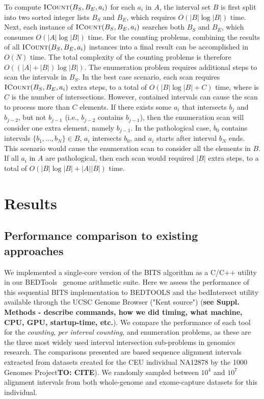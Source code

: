 \documentclass{bioinfo}
\begin{document}
	To compute $\textsc{ICount}(B_S,B_E,a_i)$ for each $a_i$ in $A$, the interval
	set $B$ is first split into two sorted integer lists $B_S$ and $B_E$,
	which requires $O(|B| \log |B|)$ time.  Next, each instance of
	$\textsc{ICount}(B_S,B_E,a_i)$ searches both $B_S$ and $B_E$, which consumes
	$O(|A| \log |B|)$ time.  For the counting problems, combining the
	results of all $\textsc{ICount}(B_S,B_E,a_i)$ instances into a final result can
	be accomplished in $O(N)$ time.  The total complexity of the counting
	problems is therefore $O((|A| + |B|) \log |B|)$.
	The enumeration problem requires additional steps to scan the
	intervals in $B_S$.  In the best case scenario, each scan requires
	$\textsc{ICount}(B_S,B_E,a_i)$ extra steps, to a total of $O(|B| \log |B|
	+ C)$ time, where is $C$ is the number of intersections.
	However,
	contained intervals can cause the scan to process more than $C$
	elements.  If there exists some $a_i$ that intersects $b_{j}$ and
	$b_{j-2}$, but not $b_{j-1}$ (i.e., $b_{j-2}$ contains $b_{j-1}$),
	then the enumeration scan will consider one extra element, namely
	$b_{j-1}$.  In the pathological case, $b_0$ contains intervals $\{b_1,
	\dots, b_N\} \in B$, $a_i$ intersects $b_0$, and $a_i$ starts after
	interval $b_N$ ends.  This scenario would cause the enumeration scan
	to consider all the elements in $B$.  If all $a_i$ in $A$ are
	pathological, then each scan would required $|B|$ extra steps, to a
	total of $O(|B| \log |B| + |A||B|)$ time.



	\section{Results}
	
	\subsection{Performance comparison to existing approaches}
	We implemented a single-core version of the BITS algorithm as a C/C++ utility 
	in our BEDTools~\citep{quinlan2010} genome arithmetic suite.
	Here we assess the performance of this sequential BITS implementation to BEDTOOLS and 
	the bedIntersect utility available through the UCSC Genome Browser ("Kent source") \citep{kent2002} 
	(\textbf{see Suppl. Methods - describe commands, how we did timing, what machine, CPU, GPU, startup-time, etc.}).
	We compare the performance of each tool for the \emph{counting}, \emph{per interval counting}, 
	and enumeration problems, as these are the three most widely used interval intersection sub-problems in genomics research. 
	The comparisons presented are based sequence alignment intervals extracted from datasets created 
	for the CEU individual NA12878 by the 1000 Genomes Project\textbf{TO: CITE}).  We randomly sampled 
	between $10^4$ and $10^7$ alignment intervals from both whole-genome and exome-capture datasets for this individual.
	
\end{document}
